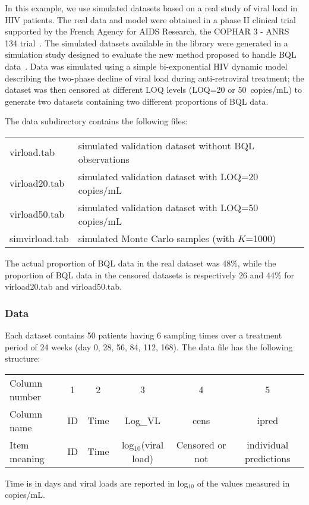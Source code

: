 \hskip 18pt In this example, we use simulated datasets based on a real study of viral load in HIV patients. The real data and model were obtained in a phase II clinical trial supported by the French Agency for AIDS Research, the COPHAR 3 - ANRS 134 trial~\cite{GoujardISA2010}. The simulated datasets available in the library were generated in a simulation study designed to evaluate the new method proposed to handle BQL data~\cite{Nguyen2012}. Data was simulated using a simple bi-exponential HIV dynamic model describing the two-phase decline of viral load during anti-retroviral treatment; the dataset was then censored at different LOQ levels (LOQ=20 or 50~copies/mL) to generate two datasets containing two different proportions of BQL data.

The {\sf data} subdirectory contains the following files:
\begin{center}
\begin{tabular} {l l}
\hline
virload.tab & simulated validation dataset without BQL observations \\
virload20.tab & simulated validation dataset with LOQ=20 copies/mL \\
virload50.tab & simulated validation dataset with LOQ=50 copies/mL\\
simvirload.tab & simulated Monte Carlo samples (with $K$=1000) \\
\hline
\end{tabular}
\end{center}
The actual proportion of BQL data in the real dataset was 48\%, while the proportion of BQL data in the censored datasets is respectively 26 and 44\% for virload20.tab and virload50.tab.

\subsubsection{Data}

\hskip 18pt Each dataset contains 50 patients having 6 sampling times over a treatment period of 24 weeks (day 0, 28, 56, 84, 112, 168). The data file has the following structure:
\begin{center}
\begin{tabular} {l c c c c c}
\hline
Column number & 1 & 2 & 3 & 4 & 5\\
Column name & ID & Time & Log\_VL & cens & ipred \\
Item meaning & ID & Time & log$_{10}$(viral load) & Censored or not & individual predictions \\
\hline
\end{tabular}
\end{center}
Time is in days and viral loads are reported in log$_{10}$ of the values measured in copies/mL.

